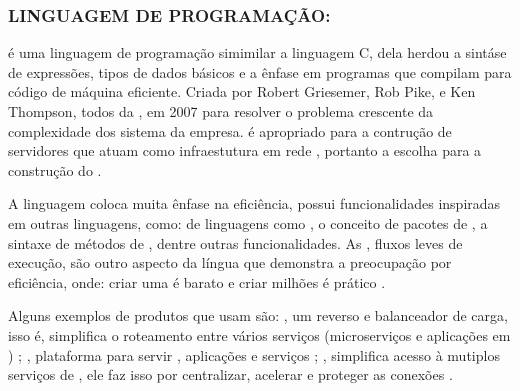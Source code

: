 \subsubsection{LINGUAGEM DE PROGRAMAÇÃO: }

 é uma linguagem de programação simimilar a linguagem C, dela herdou a sintáse de expressões, tipos de dados básicos e a ênfase em programas que compilam para código de máquina eficiente. Criada por Robert Griesemer, Rob Pike, e Ken Thompson, todos da , em 2007 para resolver o problema crescente da complexidade dos sistema da empresa.  é apropriado para a contrução de servidores que atuam como infraestutura em rede \cite{donovan2016gopl}, portanto a escolha para a construção do . 

A linguagem coloca muita ênfase na eficiência,  possui funcionalidades inspiradas em outras linguagens, como:  de linguagens como , o conceito de pacotes de , a sintaxe de métodos de , dentre outras funcionalidades. As , fluxos leves de execução, são outro aspecto da língua que demonstra a preocupação por eficiência, onde: criar uma  é barato e criar milhões é prático \cite{donovan2016gopl}. 

Alguns exemplos de produtos que usam  são: , um  reverso e balanceador de carga, isso é, simplifica o roteamento entre vários serviços (microserviços e aplicações em ) \cite{traefik_docs}; , plataforma para servir , aplicações e serviços \cite{caddy_docs}; , simplifica acesso à mutiplos serviços de , ele faz isso por centralizar, acelerar e proteger as conexões \cite{krakend_docs}.
